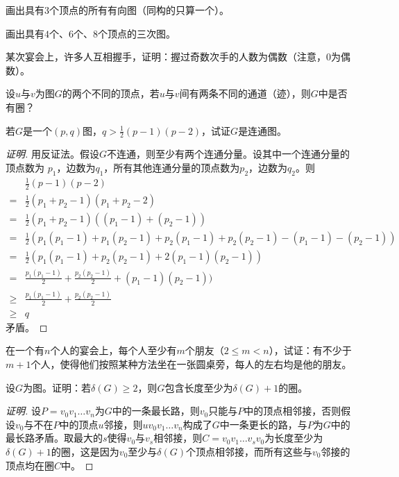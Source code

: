 \documentclass{article}
\begin{document}
\begin{CJK}{UTF8}{gbsn}
\begin{Exercise}
画出具有$3$个顶点的所有有向图（同构的只算一个）。
\end{Exercise}
\begin{Exercise}
画出具有$4$个、$6$个、$8$个顶点的三次图。
\end{Exercise}
\begin{Exercise}
某次宴会上，许多人互相握手，证明：握过奇数次手的人数为偶数（注意，$0$为偶数）。
\end{Exercise}
\begin{Exercise}
设$u$与$v$为图$G$的两个不同的顶点，若$u$与$v$间有两条不同的通道（迹），则$G$中是否有圈？
\end{Exercise}
\begin{Exercise}
若$G$是一个$(p,q)$图，$q > \frac{1}{2}(p-1)(p-2)$，试证$G$是连通图。  
\end{Exercise}
\begin{proof}[证明]
  用反证法。假设$G$不连通，则至少有两个连通分量。设其中一个连通分量的顶点数为
  $p_1$，边数为$q_1$，所有其他连通分量的顶点数为$p_2$，边数为$q_2$。则
  \begin{equation*}
    \begin{split}
      &\frac{1}{2}(p-1)(p-2)\\
      =&\frac{1}{2}(p_1 + p_2 -1)(p_1 + p_2 -2)\\
      =&\frac{1}{2}(p_1 + p_2 -1)((p_1 - 1) + (p_2 - 1))\\
      =&\frac{1}{2}(p_1(p_1 -1) +  p_1(p_2 - 1) + p_2(p_1 - 1) + p_2(p_2-1) - (p_1 - 1) - (p_2-1))\\
      =&\frac{1}{2}(p_1(p_1 -1) +   p_2(p_2-1) + 2(p_1 - 1)(p_2-1))\\
      =&\frac{p_1(p_1 -1)}{2} +   \frac{p_2(p_2-1)}{2} + (p_1 - 1)(p_2-1))\\
      \geq&\frac{p_1(p_1 -1)}{2} +   \frac{p_2(p_2-1)}{2}\\
      \geq & q
    \end{split}
  \end{equation*}
  矛盾。
\end{proof}


\begin{Exercise}
在一个有$n$个人的宴会上，每个人至少有$m$个朋友（$2\leq m < n$），试证：有不少于$m+1$个人，使得他们按照某种方法坐在一张圆桌旁，每人的左右均是他的朋友。
\end{Exercise}
\begin{Exercise}
设$G$为图。证明：若$\delta(G)\geq 2$，则$G$包含长度至少为$\delta(G)+1$的圈。  
\end{Exercise}
\begin{proof}[证明]
  设$P=v_0v_1\ldots v_n$为$G$中的一条最长路，则$v_0$只能与$P$中的顶点相邻接，否则假设$v_0$与不在$P$中的顶点$u$邻接，则$uv_0v_1\ldots v_n$构成了$G$中一条更长的路，与$P$为$G$中的最长路矛盾。取最大的$s$使得$v_0$与$v_s$相邻接，则$C=v_0v_1\ldots v_sv_0$为长度至少为$\delta(G)+1$的圈，这是因为$v_0$至少与$\delta(G)$个顶点相邻接，而所有这些与$v_0$邻接的顶点均在圈$C$中。
\end{proof}


\end{CJK}
\end{document}

